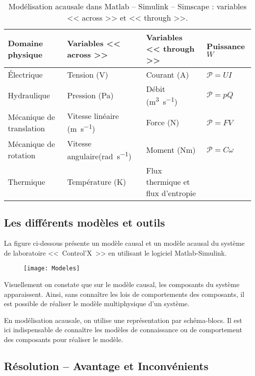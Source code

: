 \begin{table*}[!h]
\caption{Modélisation acausale dans Matlab -- Simulink -- Simscape : variables << across >> et << through >>.}
\begin{tabular}{llll}
\midrule
Domaine physique & Variables << across >> &  Variables << through >> & Puissance $\si{W}$\\ \hline
Électrique & Tension (\si{V})& Courant (\si{A}) & $\mathcal{P}=UI$\\ 
Hydraulique & Pression (\si{Pa})& Débit (\si{m^3.s^{-1}}) & $\mathcal{P}=pQ$\\ 
Mécanique de translation & Vitesse linéaire (\si{m.s^{-1}})& Force (\si{N})& $\mathcal{P}=FV$\\ 
Mécanique de rotation & Vitesse angulaire(\si{rad.s^{-1}}) & Moment (\si{Nm})& $\mathcal{P}=C\omega$\\ 
Thermique & Température (K)& Flux thermique et flux d'entropie & \\ 
\bottomrule
\end{tabular}
\end{table*}

\subsection{Les différents modèles et outils}

La figure ci-dessous présente un modèle causal et un modèle acausal du système de laboratoire <<~Control'X~>> en utilisant le logiciel Matlab-Simulink.

\begin{figure*}[!h]
\texttt{[image: Modeles]}
\end{figure*}

Visuellement on constate que sur le modèle causal, les composants du système apparaissent. Ainsi, sans connaître les lois de comportements des composants, il est possible de réaliser le modèle multiphysique d'un système.

En modélisation acausale, on utilise une représentation par schéma-blocs. Il est ici indispensable de connaître les modèles de connaissance ou de comportement des composants pour réaliser le modèle.

\subsection{Résolution -- Avantage et Inconvénients}

